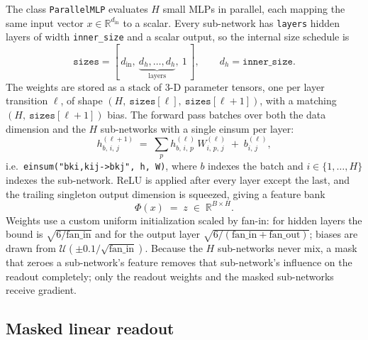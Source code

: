 \documentclass[11pt]{article}
\newcommand{\R}{\mathbb{R}}
\newcommand{\parMLP}{\Phi}                 %
\newcommand{\Ho}{H}                        %
\newcommand{\code}[1]{\texttt{\small #1}}
\begin{document}
The class \code{ParallelMLP} evaluates $\Ho$ small MLPs in parallel, each mapping
the same input vector $x \in \R^{d_{\mathrm{in}}}$ to a scalar. Every sub-network
has \code{layers} hidden layers of width \code{inner\_size} and a scalar output,
so the internal size schedule is
\[
\texttt{sizes} = [\,d_{\mathrm{in}},\ \underbrace{d_h,\dots,d_h}_{\text{layers}},\ 1\,],
\qquad d_h = \texttt{inner\_size}.
\]
The weights are stored as a stack of 3-D parameter tensors, one per layer
transition $\ell$, of shape $(\Ho,\ \texttt{sizes}[\ell],\ \texttt{sizes}[\ell{+}1])$,
with a matching $(\Ho,\ \texttt{sizes}[\ell{+}1])$ bias. The forward pass batches
over both the data dimension and the $\Ho$ sub-networks with a single einsum per
layer:
\[
h^{(\ell+1)}_{b,\,i,\,j} \;=\; \sum_{p} h^{(\ell)}_{b,\,i,\,p}\, W^{(\ell)}_{i,\,p,\,j} \;+\; b^{(\ell)}_{i,\,j},
\]
i.e.\ \code{einsum("bki,kij->bkj", h, W)}, where $b$ indexes the batch and
$i \in \{1,\dots,\Ho\}$ indexes the sub-network. ReLU is applied after every layer
except the last, and the trailing singleton output dimension is squeezed, giving a
feature bank
\[
\parMLP(x) \;=\; z \;\in\; \R^{B \times \Ho}.
\]
Weights use a custom uniform initialization scaled by fan-in: for hidden layers
the bound is $\sqrt{6/\text{fan\_in}}$ and for the output layer
$\sqrt{6/(\text{fan\_in}+\text{fan\_out})}$; biases are drawn from
$\mathcal{U}(\pm 0.1/\sqrt{\text{fan\_in}})$. Because the $\Ho$ sub-networks never
mix, a mask that zeroes a sub-network's feature removes that sub-network's
influence on the readout completely; only the readout weights and the masked
sub-networks receive gradient.

\subsection{Masked linear readout}
\label{sec:readout}
\end{document}
